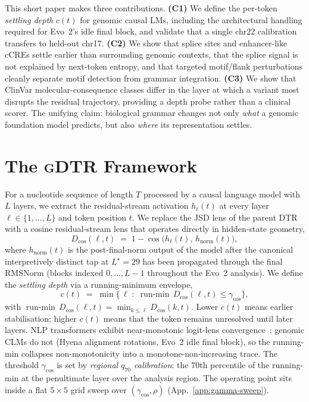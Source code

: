 \documentclass{article}
\theoremstyle{plain}
\theoremstyle{definition}
\theoremstyle{remark}
\newcommand{\gDTR}{\textsc{gDTR}}
\newcommand{\hl}{h_{\ell}}
\newcommand{\hnorm}{h_{\mathrm{norm}}}
\newcommand{\Dcos}{D_{\cos}}
\newcommand{\runmin}{\operatorname{run\text{-}min}}
\begin{document}
This short paper makes three contributions. \textbf{(C1)} We define the per-token \emph{settling depth} $c(t)$ for genomic causal LMs, including the architectural handling required for Evo~2's idle final block, and validate that a single chr22 calibration transfers to held-out chr17. \textbf{(C2)} We show that splice sites and enhancer-like cCREs settle earlier than surrounding genomic contexts, that the splice signal is not explained by next-token entropy, and that targeted motif/flank perturbations cleanly separate motif detection from grammar integration. \textbf{(C3)} We show that ClinVar molecular-consequence classes differ in the layer at which a variant most disrupts the residual trajectory, providing a depth probe rather than a clinical scorer. The unifying claim: biological grammar changes not only \emph{what} a genomic foundation model predicts, but also \emph{where} its representation settles.


\section{The \gDTR{} Framework}
\label{sec:framework}

For a nucleotide sequence of length $T$ processed by a causal language model with $L$ layers, we extract the residual-stream activation $\hl(t)$ at every layer $\ell\!\in\!\{1,\ldots,L\}$ and token position $t$. We replace the JSD lens of the parent DTR~\cite{chen2026deepthinking} with a cosine residual-stream lens that operates directly in hidden-state geometry,
\begin{equation}
  \Dcos(\ell, t) \;=\; 1 - \cos\!\bigl(\hl(t),\, \hnorm(t)\bigr),
  \label{eq:cos-lens}
\end{equation}
where $\hnorm(t)$ is the post-final-norm output of the model after the canonical interpretively distinct tap at $L^\star\!=\!29$ has been propagated through the final RMSNorm (blocks indexed $0,\ldots,L\!-\!1$ throughout the Evo~2 analysis). We define the \emph{settling depth} via a running-minimum envelope,
\begin{equation}
  c(t) \;=\; \min\bigl\{\, \ell \;:\; \runmin\,\Dcos(\ell, t) \le \gamma_{\cos}\bigr\},
  \label{eq:settling}
\end{equation}
with $\runmin\,\Dcos(\ell,t) = \min_{k\le\ell}\Dcos(k,t)$. Lower $c(t)$ means earlier stabilisation; higher $c(t)$ means that the token remains unresolved until later layers. NLP transformers exhibit near-monotonic logit-lens convergence~\cite{nostalgebraist2020logitlens,belrose2023tunedlens}; genomic CLMs do not (Hyena alignment rotations, Evo~2 idle final block), so the running-min collapses non-monotonicity into a monotone-non-increasing trace. The threshold $\gamma_{\cos}$ is set by \emph{regional $q_{70}$ calibration}: the 70th percentile of the running-min at the penultimate layer over the analysis region. The operating point sits inside a flat $5\!\times\!5$ grid sweep over $(\gamma_{\cos},\rho)$ (App.~\ref{app:gamma-sweep}).
\end{document}
